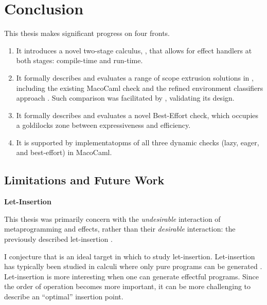 \chapter{Conclusion}

This thesis makes significant progress on four fronts. 

\begin{enumerate}
\item It introduces a novel two-stage calculus, \calculusName{}, that allows for effect handlers at both stages: compile-time and run-time.

\item It formally describes and evaluates a range of scope extrusion solutions in \calculusName{}, including the existing MacoCaml check \citep{kiselyov-14} and the refined environment classifiers approach \citep{kiselyov-16}. Such comparison was facilitated by \calculusName{}, validating its design.

\item It formally describes and evaluates a novel Best-Effort check, which occupies a goldilocks zone between expressiveness and efficiency.

\item It is supported by implementatopms of all three dynamic checks (lazy, eager, and best-effort) in MacoCaml. 
\end{enumerate}

\section{Limitations and Future Work}
\begin{minipage}[t]{0.25\textwidth}
  \textbf{\textsf{Let-Insertion}}
\end{minipage}%
\begin{minipage}[t]{0.75\textwidth}
  This thesis was primarily concern with the \textit{undesirable} interaction of metaprogramming and effects, rather than their \textit{desirable} interaction: the previously described let-insertion \citep{yallop-2019}. 
  \vspace{2mm}

  I conjecture that \calculusName{} is an ideal target in which to study let-insertion. Let-insertion has typically been studied in calculi where only pure programs can be generated \citep{isoda-24}. Let-insertion is more interesting when one can generate effectful programs. Since the order of operation becomes more important, it can be more challenging to describe an ``optimal'' insertion point.
  \vspace{4mm}
\end{minipage}\\

